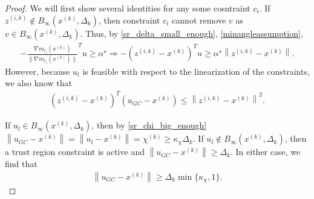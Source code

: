 \documentclass{article}
\theoremstyle{case}
\newcommand{\xk}{{x^{(k)}}}
\newcommand{\dk}{\Delta_k}
\newcommand{\chik}{{\chi^{(k)}}}
\newcommand{\gk}{{\nabla m_f^{(k)}(x^{(k)})}}
\newcommand{\zik}{{z^{(i, k)}}}
\newcommand{\gmcik}{{\nabla m_{c_i}(\xk)}}
\newcommand{\minanglealpha}{{ \alpha^{\star} }}
\newcommand{\tr}{{ B_{\infty}\left(\xk, \dk\right) }}
\newcommand{\hfb}{{M_{\nabla^2 f}}}
\begin{document}
\begin{proof}












We will first show several identities for any some cosntraint $c_i$.
\color{red}
If $\zik \not \in \tr$, then constraint $c_i$ cannot remove $v$ as $v\in\tr$.
\color{black}
Thus, by \cref{sr_delta_small_enough}, \cref{minangleassumption}, 
\begin{align}
-\frac {\gmcik}{\|\gmcik\|} ^Tu \ge \minanglealpha \Longrightarrow -\left(\zik - \xk\right)^Tu \ge \minanglealpha \left\|\zik - \xk\right\|. \label{u_is_feasible}
\end{align}
However, because $u_l$ is feasible with respect to the linearization of the constraints, we also know that
\begin{align}
\left(\zik - \xk\right)^T(u_{GC} - \xk) \le \left\|\zik - \xk\right\|^2. \label{gc_is_feasible}
\end{align}


If $u_l \in \tr$, then by \cref{sr_chi_big_enough} $\left\|u_{GC} - \xk\right\|  = \left\|u_{l} - \xk\right\| = \chik \ge \kappa_{\chi} \dk$.
If $u_l \not \in \tr$, then a trust region constraint is active and $\left\|u_{GC} - \xk\right\| \ge \dk$.
In either case, we find that 
\begin{align}
\left\|u_{GC} - \xk\right\| \ge \dk \min\{\kappa_{\chi}, 1 \} \label{gc_big_enough}.
\end{align}


\end{proof}
\end{document}
